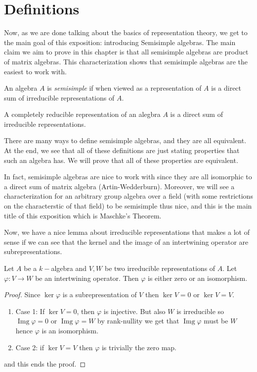 
\section{Definitions}

Now, as we are done talking about the basics of representation theory, we get to the main goal of this exposition: introducing Semisimple algebras. The main claim we aim to prove in this chapter is that all semisimple algebras are product of matrix algebras. This characterization shows that semisimple algebras are the easiest to work with.

\begin{definition}
    An algebra $A$ is \emph{semisimple} if when viewed as a representation of $A$ is a direct sum of irreducible representations of $A$.
    
\end{definition}
\begin{definition}
    A completely reducible representation of an alegbra $A$ is a direct sum of irreducible representations.
\end{definition}
There are many ways to define semisimple algebras, and they are all equivalent. At the end, we see that all of these definitions are just stating properties that such an algebra has.
We will prove that all of these properties are equivalent.

In fact, semisimple algebras are nice to work with since they are all isomorphic to a direct sum of matrix algebra (Artin-Wedderburn). Moreover, we will see a characterization for an arbitrary group algebra over a field (with some restrictions on the characterstic of that field) to be semisimple thus nice, and this is the main title of this exposition which is Maschke's Theorem.

Now, we have a nice lemma about irreducible representations that makes a lot of sense if we can see that the kernel and the image of an intertwining operator are subrepresentations.

\begin{lemma}
    Let $A$ be a $k-$algebra and $V,W$ be two irreducible representations of $A$. Let $\varphi: V \to W$ be an intertwining operator. Then $\varphi$ is either zero or an isomorphism. 
\end{lemma}
\begin{proof}
    Since $\ker \varphi$ is a subrepresentation of $V$ then $\ker V ={0}$ or $\ker V = V$. 
    \begin{enumerate}
        \item Case 1: If $\ker V =0 $, then $\varphi$ is injective. But also $W$ is irreducible so $\operatorname{Img} \varphi = {0}$ or $\operatorname{Img} \varphi = W$ by rank-nullity we get that $\operatorname{Img} \varphi $ must be $W$ hence $\varphi$ is an isomorphism.
        \item Case 2: if $\ker V = V$ then $\varphi$ is trivially the zero map. 
    \end{enumerate}
    and this ends the proof.
\end{proof}

